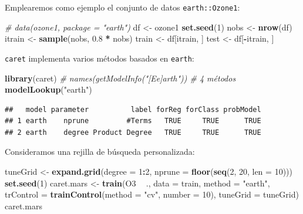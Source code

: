\documentclass[
]{book}
\newenvironment{Shaded}{\begin{snugshade}}{\end{snugshade}}
\newcommand{\CommentTok}[1]{\textcolor[rgb]{0.56,0.35,0.01}{\textit{#1}}}
\newcommand{\DataTypeTok}[1]{\textcolor[rgb]{0.13,0.29,0.53}{#1}}
\newcommand{\DecValTok}[1]{\textcolor[rgb]{0.00,0.00,0.81}{#1}}
\newcommand{\FloatTok}[1]{\textcolor[rgb]{0.00,0.00,0.81}{#1}}
\newcommand{\KeywordTok}[1]{\textcolor[rgb]{0.13,0.29,0.53}{\textbf{#1}}}
\newcommand{\NormalTok}[1]{#1}
\newcommand{\OperatorTok}[1]{\textcolor[rgb]{0.81,0.36,0.00}{\textbf{#1}}}
\newcommand{\StringTok}[1]{\textcolor[rgb]{0.31,0.60,0.02}{#1}}
\theoremstyle{break}
\theoremstyle{definition}
\theoremstyle{definition}
\theoremstyle{definition}
\theoremstyle{remark}
\begin{document}
Emplearemos como ejemplo el conjunto de datos \texttt{earth::Ozone1}:

\begin{Shaded}
\begin{Highlighting}[]
\CommentTok{# data(ozone1, package = "earth")}
\NormalTok{df <-}\StringTok{ }\NormalTok{ozone1  }
\KeywordTok{set.seed}\NormalTok{(}\DecValTok{1}\NormalTok{)}
\NormalTok{nobs <-}\StringTok{ }\KeywordTok{nrow}\NormalTok{(df)}
\NormalTok{itrain <-}\StringTok{ }\KeywordTok{sample}\NormalTok{(nobs, }\FloatTok{0.8} \OperatorTok{*}\StringTok{ }\NormalTok{nobs)}
\NormalTok{train <-}\StringTok{ }\NormalTok{df[itrain, ]}
\NormalTok{test <-}\StringTok{ }\NormalTok{df[}\OperatorTok{-}\NormalTok{itrain, ]}
\end{Highlighting}
\end{Shaded}

\texttt{caret} implementa varios métodos basados en \texttt{earth}:

\begin{Shaded}
\begin{Highlighting}[]
\KeywordTok{library}\NormalTok{(caret)}
\CommentTok{# names(getModelInfo("[Ee]arth")) # 4 métodos}
\KeywordTok{modelLookup}\NormalTok{(}\StringTok{"earth"}\NormalTok{)}
\end{Highlighting}
\end{Shaded}

\begin{verbatim}
##   model parameter          label forReg forClass probModel
## 1 earth    nprune         #Terms   TRUE     TRUE      TRUE
## 2 earth    degree Product Degree   TRUE     TRUE      TRUE
\end{verbatim}

Consideramos una rejilla de búsqueda personalizada:

\begin{Shaded}
\begin{Highlighting}[]
\NormalTok{tuneGrid <-}\StringTok{ }\KeywordTok{expand.grid}\NormalTok{(}\DataTypeTok{degree =} \DecValTok{1}\OperatorTok{:}\DecValTok{2}\NormalTok{, }
                       \DataTypeTok{nprune =} \KeywordTok{floor}\NormalTok{(}\KeywordTok{seq}\NormalTok{(}\DecValTok{2}\NormalTok{, }\DecValTok{20}\NormalTok{, }\DataTypeTok{len =} \DecValTok{10}\NormalTok{)))}
\KeywordTok{set.seed}\NormalTok{(}\DecValTok{1}\NormalTok{)}
\NormalTok{caret.mars <-}\StringTok{ }\KeywordTok{train}\NormalTok{(O3 }\OperatorTok{~}\StringTok{ }\NormalTok{., }\DataTypeTok{data =}\NormalTok{ train, }\DataTypeTok{method =} \StringTok{"earth"}\NormalTok{,}
    \DataTypeTok{trControl =} \KeywordTok{trainControl}\NormalTok{(}\DataTypeTok{method =} \StringTok{"cv"}\NormalTok{, }\DataTypeTok{number =} \DecValTok{10}\NormalTok{),}
    \DataTypeTok{tuneGrid =}\NormalTok{ tuneGrid)}
\NormalTok{caret.mars}
\end{Highlighting}
\end{Shaded}
\end{document}
